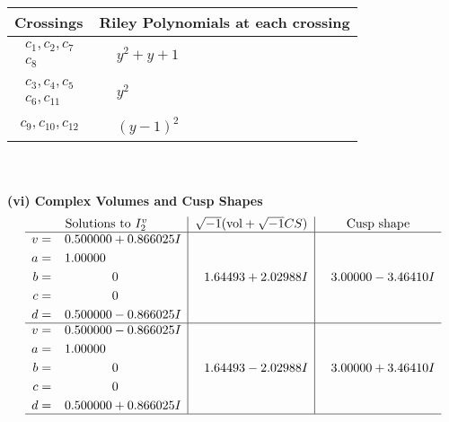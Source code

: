 \documentclass[1p]{elsarticle_modified}
\theoremstyle{definition}
\newcommand{\I}{\sqrt{-1}}
\begin{document}
\begin{tabular}{m{50pt}|m{274pt}}
Crossings & \hspace{64pt}Riley Polynomials at each crossing \\
\hline $$\begin{aligned}c_{1},c_{2},c_{7}\\c_{8}\end{aligned}$$&$\begin{aligned}
&y^2+y+1
\end{aligned}$\\
\hline $$\begin{aligned}c_{3},c_{4},c_{5}\\c_{6},c_{11}\end{aligned}$$&$\begin{aligned}
&y^2
\end{aligned}$\\
\hline $$\begin{aligned}c_{9},c_{10},c_{12}\end{aligned}$$&$\begin{aligned}
&(y-1)^2
\end{aligned}$\\
\hline
\end{tabular}\\~\\
\newpage\flushleft \textbf{(vi) Complex Volumes and Cusp Shapes}
$$\begin{array}{c|c|c}  
\text{Solutions to }I^v_{2}& \I (\text{vol} + \sqrt{-1}CS) & \text{Cusp shape}\\
 \hline 
\begin{aligned}
v &= \phantom{-}0.500000 + 0.866025 I \\
a &= \phantom{-}1.00000\phantom{ +0.000000I} \\
b &= \phantom{-0.000000 } 0 \\
c &= \phantom{-0.000000 } 0 \\
d &= \phantom{-}0.500000 - 0.866025 I\end{aligned}
 & \phantom{-}1.64493 + 2.02988 I & \phantom{-}3.00000 - 3.46410 I \\ \hline\begin{aligned}
v &= \phantom{-}0.500000 - 0.866025 I \\
a &= \phantom{-}1.00000\phantom{ +0.000000I} \\
b &= \phantom{-0.000000 } 0 \\
c &= \phantom{-0.000000 } 0 \\
d &= \phantom{-}0.500000 + 0.866025 I\end{aligned}
 & \phantom{-}1.64493 - 2.02988 I & \phantom{-}3.00000 + 3.46410 I\\
 \hline 
 \end{array}$$\newpage\newpage\renewcommand{\arraystretch}{1}
\end{document}
